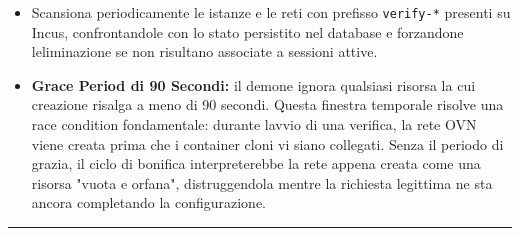 \begin{itemize}
\tightlist
\item
  Scansiona periodicamente le istanze e le reti con prefisso
  \passthrough{\lstinline!verify-*!} presenti su Incus, confrontandole
  con lo stato persistito nel database e forzandone
  l\textquotesingle eliminazione se non risultano associate a sessioni
  attive.
\item
  \textbf{Grace Period di 90 Secondi:} il demone ignora qualsiasi
  risorsa la cui creazione risalga a meno di 90 secondi. Questa finestra
  temporale risolve una race condition fondamentale: durante
  l\textquotesingle avvio di una verifica, la rete OVN viene creata
  prima che i container cloni vi siano collegati. Senza il periodo di
  grazia, il ciclo di bonifica interpreterebbe la rete appena creata
  come una risorsa "vuota e orfana", distruggendola mentre la richiesta
  legittima ne sta ancora completando la configurazione.
\end{itemize}

\begin{center}\rule{0.5\linewidth}{0.5pt}\end{center}
